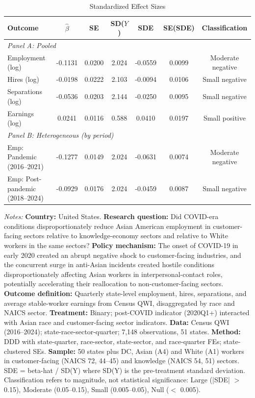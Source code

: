 \begin{table}[t]
\centering
\caption{Standardized Effect Sizes}
\label{tab:sde}
\footnotesize
\begin{threeparttable}
\begin{tabular}{lcccccc}
\toprule
Outcome & $\hat{\beta}$ & SE & SD($Y$) & SDE & SE(SDE) & Classification \\
\midrule
\multicolumn{7}{l}{\textit{Panel A: Pooled}} \\
Employment (log) & -0.1131 & 0.0200 & 2.024 & -0.0559 & 0.0099 & Moderate negative \\
Hires (log) & -0.0198 & 0.0222 & 2.103 & -0.0094 & 0.0106 & Small negative \\
Separations (log) & -0.0536 & 0.0203 & 2.144 & -0.0250 & 0.0095 & Small negative \\
Earnings (log) & 0.0241 & 0.0116 & 0.588 & 0.0410 & 0.0197 & Small positive \\
\midrule
\multicolumn{7}{l}{\textit{Panel B: Heterogeneous (by period)}} \\
Emp: Pandemic (2016--2021) & -0.1277 & 0.0149 & 2.024 & -0.0631 & 0.0074 & Moderate negative \\
Emp: Post-pandemic (2018--2024) & -0.0929 & 0.0176 & 2.024 & -0.0459 & 0.0087 & Small negative \\
\bottomrule
\end{tabular}
\begin{tablenotes}\scriptsize
\item \textit{Notes:} \textbf{Country:} United States.
\textbf{Research question:} Did COVID-era conditions disproportionately reduce Asian American employment in customer-facing sectors relative to knowledge-economy sectors and relative to White workers in the same sectors?
\textbf{Policy mechanism:} The onset of COVID-19 in early 2020 created an abrupt negative shock to customer-facing industries, and the concurrent surge in anti-Asian incidents created hostile conditions disproportionately affecting Asian workers in interpersonal-contact roles, potentially accelerating their reallocation to non-customer-facing sectors.
\textbf{Outcome definition:} Quarterly state-level employment, hires, separations, and average stable-worker earnings from Census QWI, disaggregated by race and NAICS sector.
\textbf{Treatment:} Binary; post-COVID indicator (2020Q1+) interacted with Asian race and customer-facing sector indicators.
\textbf{Data:} Census QWI (2016--2024); state-race-sector-quarter; 7,148 observations, 51 states.
\textbf{Method:} DDD with state-quarter, race-sector, state-sector, and race-quarter FEs; state-clustered SEs.
\textbf{Sample:} 50 states plus DC, Asian (A4) and White (A1) workers in customer-facing (NAICS 72, 44--45) and knowledge (NAICS 54, 51) sectors.
SDE = beta-hat / SD(Y) where SD(Y) is the pre-treatment standard deviation.
Classification refers to magnitude, not statistical significance:
Large (|SDE| $>$ 0.15), Moderate (0.05--0.15), Small (0.005--0.05), Null ($<$ 0.005).
\end{tablenotes}
\end{threeparttable}
\end{table}
